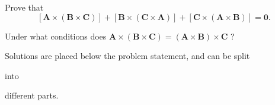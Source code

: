 

%
%

\newcommand{\hmwkTitle}{HW 01}
\newcommand{\hmwkSubTitle}{Assignment 1}
\newcommand{\hmwkDueDate}{February 6th, 2025}
\newcommand{\hmwkDueTime}{11:59 PM}
\newcommand{\hmwkClass}{PHYS 313}
\newcommand{\hmwkClassTime}{0101}
\newcommand{\hmwkClassInstructor}{Dr. Ji}
\newcommand{\hmwkAuthorName}{\textbf{Vai Srivastava}}
\newcommand{\hmwkCompletionDate}{\today}



\maketitle

\pagebreak

\begin{hwkProblem}{1.6}{}

	Prove that
	\[
		\left[ \mathbf{A} \times \left( \mathbf{B} \times \mathbf{C} \right) \right] + \left[ \mathbf{B} \times \left( \mathbf{C} \times \mathbf{A} \right) \right] + \left[ \mathbf{C} \times \left( \mathbf{A} \times \mathbf{B} \right) \right] = \mathbf{0} .
	\]

	Under what conditions does \( \mathbf{A} \times \left( \mathbf{B} \times \mathbf{C} \right) = \left( \mathbf{A} \times \mathbf{B} \right) \times \mathbf{C} \) ?

	\hwkSol

	Solutions are placed below the problem statement, and can be split

	\hwkPart

	into

	\hwkPart

	different parts.

\end{hwkProblem}


